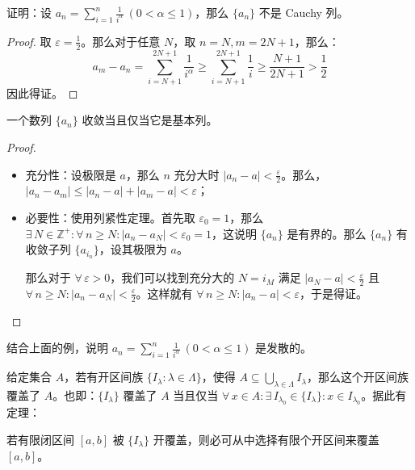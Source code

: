 \begin{example}
	证明：设 $a_n = \sum_{i=1}^n \frac{1}{i^\alpha}\ (0 < \alpha \le 1)$，那么 $\{a_n\}$ 不是 Cauchy 列。

	\begin{proof}
		取 $\varepsilon = \frac{1}{2}$。那么对于任意 $N$，取 $n = N, m = 2N + 1$，那么：
		$$
		a_m - a_n = \sum_{i=N+1}^{2N+1} \frac{1}{i^\alpha} \ge \sum_{i=N+1}^{2N+1} \frac{1}{i} \ge \frac{N + 1}{2N + 1} > \frac{1}{2}
		$$
		因此得证。
	\end{proof}
\end{example}

\begin{theorem}[柯西收敛准则]
	一个数列 $\{a_n\}$ 收敛当且仅当它是基本列。

	\begin{proof}
		\begin{itemize}
			\item 充分性：设极限是 $a$，那么 $n$ 充分大时 $|a_n - a| < \frac{\varepsilon}{2}$。那么，$|a_n - a_m| \le |a_n - a| + |a_m - a| < \varepsilon$；

			\item 必要性：使用列紧性定理。首先取 $\varepsilon_0 = 1$，那么 $\exists\,N \in \mathbb{Z}^+: \forall\,n \ge N: |a_n - a_N| < \varepsilon_0 = 1$，这说明 $\{a_n\}$ 是有界的。那么 $\{a_n\}$ 有收敛子列 $\{a_{i_n}\}$，设其极限为 $a$。
			
			那么对于 $\forall\,\varepsilon > 0$，我们可以找到充分大的 $N = i_M$ 满足 $|a_N - a| < \frac{\varepsilon}{2}$ 且 $\forall\,n \ge N: |a_n - a_N| < \frac{\varepsilon}{2}$。这样就有 $\forall\,n \ge N: |a_n - a| < \varepsilon$，于是得证。
		\end{itemize}
	\end{proof}
\end{theorem}

结合上面的例，说明 $a_n = \sum_{i=1}^n \frac{1}{i^\alpha}\ (0 < \alpha \le 1)$ 是发散的。

给定集合 $A$，若有开区间族 $\{I_\lambda: \lambda \in \Lambda\}$，使得 $A \subseteq \bigcup_{\lambda \in \Lambda} I_\lambda$，那么这个开区间族覆盖了 $A$。也即：$\{I_\lambda\}$ 覆盖了 $A$ 当且仅当 $\forall\,x \in A: \exists\, I_{\lambda_0} \in \{I_\lambda\}: x \in I_{\lambda_0}$。据此有定理：

\begin{theorem}
	若有限闭区间 $[a,b]$ 被 $\{I_\lambda\}$ 开覆盖，则必可从中选择有限个开区间来覆盖 $[a,b]$。
\end{theorem}

